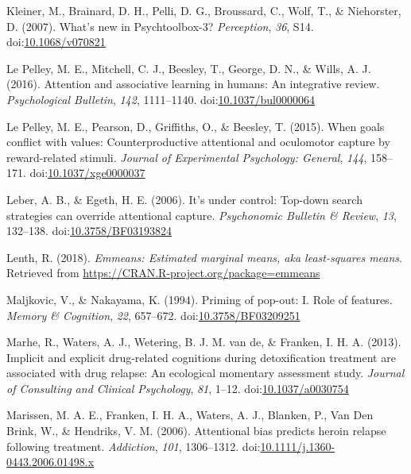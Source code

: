 \documentclass[jou, a4paper, noextraspace,floatsintext]{apa6}
\theoremstyle{definition}
\theoremstyle{definition}
\theoremstyle{definition}
\theoremstyle{remark}
\begin{document}
\hypertarget{ref-Kleiner2007}{}
Kleiner, M., Brainard, D. H., Pelli, D. G., Broussard, C., Wolf, T., \&
Niehorster, D. (2007). What's new in Psychtoolbox-3? \emph{Perception},
\emph{36}, S14.
doi:\href{https://doi.org/10.1068/v070821}{10.1068/v070821}

\hypertarget{ref-LePelleya}{}
Le Pelley, M. E., Mitchell, C. J., Beesley, T., George, D. N., \& Wills,
A. J. (2016). Attention and associative learning in humans: An
integrative review. \emph{Psychological Bulletin}, \emph{142},
1111--1140.
doi:\href{https://doi.org/10.1037/bul0000064}{10.1037/bul0000064}

\hypertarget{ref-LePelley2015b}{}
Le Pelley, M. E., Pearson, D., Griffiths, O., \& Beesley, T. (2015).
When goals conflict with values: Counterproductive attentional and
oculomotor capture by reward-related stimuli. \emph{Journal of
Experimental Psychology: General}, \emph{144}, 158--171.
doi:\href{https://doi.org/10.1037/xge0000037}{10.1037/xge0000037}

\hypertarget{ref-Leber2006}{}
Leber, A. B., \& Egeth, H. E. (2006). It's under control: Top-down
search strategies can override attentional capture. \emph{Psychonomic
Bulletin \& Review}, \emph{13}, 132--138.
doi:\href{https://doi.org/10.3758/BF03193824}{10.3758/BF03193824}

\hypertarget{ref-R-emmeans}{}
Lenth, R. (2018). \emph{Emmeans: Estimated marginal means, aka
least-squares means}. Retrieved from
\url{https://CRAN.R-project.org/package=emmeans}

\hypertarget{ref-Maljkovic1994}{}
Maljkovic, V., \& Nakayama, K. (1994). Priming of pop-out: I. Role of
features. \emph{Memory \& Cognition}, \emph{22}, 657--672.
doi:\href{https://doi.org/10.3758/BF03209251}{10.3758/BF03209251}

\hypertarget{ref-Marhe2013}{}
Marhe, R., Waters, A. J., Wetering, B. J. M. van de, \& Franken, I. H.
A. (2013). Implicit and explicit drug-related cognitions during
detoxification treatment are associated with drug relapse: An ecological
momentary assessment study. \emph{Journal of Consulting and Clinical
Psychology}, \emph{81}, 1--12.
doi:\href{https://doi.org/10.1037/a0030754}{10.1037/a0030754}

\hypertarget{ref-Marissen2006}{}
Marissen, M. A. E., Franken, I. H. A., Waters, A. J., Blanken, P., Van
Den Brink, W., \& Hendriks, V. M. (2006). Attentional bias predicts
heroin relapse following treatment. \emph{Addiction}, \emph{101},
1306--1312.
doi:\href{https://doi.org/10.1111/j.1360-0443.2006.01498.x}{10.1111/j.1360-0443.2006.01498.x}
\end{document}
